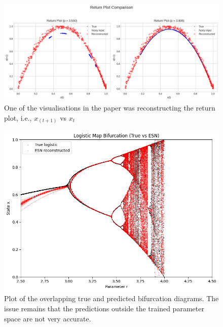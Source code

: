 \documentclass[numbered]{ivt-style/standard}
\begin{document}
\begin{figure}[H]
    \centering
    \includegraphics[width=1\linewidth]{figures/bd_return_plot_2.png}
    \caption{One of the visualisations in the paper was reconstructing the return plot, i.e., $x_{(t+1)}$ vs $x_t$}
    \label{fig:bd_2}
\end{figure}

\begin{figure}[H]
    \centering
    \includegraphics[width=0.8\linewidth]{figures/bf_3_results_overlapped.png}
    \caption{Plot of the overlapping true and predicted bifurcation diagrams. The issue remains that the predictions outside the trained parameter space are not very accurate.}
    \label{fig:bd_3}
\end{figure}
\end{document}
